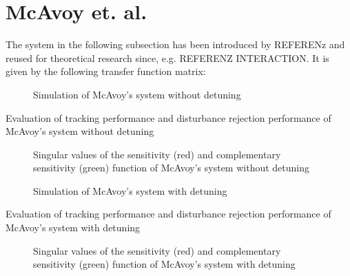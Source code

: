 \newpage

\section{McAvoy et. al.}%
\label{c:fotd:s:mcavoy}

The system in the following subsection has been introduced by REFERENz and reused for theoretical research since, e.g. REFERENZ INTERACTION. It is given by the following transfer function matrix:


\begin{figure}[H]\centering

\caption{Simulation of McAvoy's system without detuning}
\label{c:fotd:s:mcavoy:f:SimNotDetuned}
\end{figure}

\begin{table}[H]
\centering
\caption{Evaluation of tracking performance and disturbance rejection performance of McAvoy's system without detuning}
\label{c:fotd:s:mcavoy:tab:eval1}

\end{table}

\begin{figure}[H]\centering

\caption{Singular values of the sensitivity (red) and complementary sensitivity (green) function of  McAvoy's system without detuning}
\label{c:fotd:s:mcavoy:f:SingValNotDetuned}
\end{figure}

\begin{figure}[H]\centering

\caption{Simulation of McAvoy's system with detuning}
\label{c:fotd:s:mcavoy:f:SimDetuned}
\end{figure}

\begin{table}[H]
\centering
\caption{Evaluation of tracking performance and disturbance rejection performance of McAvoy's system with detuning}
\label{c:fotd:s:mcavoy:tab:eval1}

\end{table}

\begin{figure}[H]\centering

\caption{Singular values of the sensitivity (red) and complementary sensitivity (green) function of  McAvoy's system with detuning}
\label{c:fotd:s:mcavoy:f:SingValDetuned}
\end{figure}

